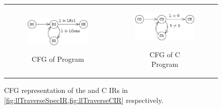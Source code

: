 \begin{figure}
\begin{tabular}{@{}c@{}c@{}}
\begin{subfigure}[b]{0.5\textwidth}
\begin{center}
{\includegraphics[scale=1.4]{chapters/figures/figSumListSpecCfg.pdf}}
\end{center}
\caption{\label{fig:llTraverseSpecCFG}CFG of \SpecL{} Program}
\end{subfigure}%
&
\begin{subfigure}[b]{0.5\textwidth}
\begin{center}
{\includegraphics[scale=1.4]{chapters/figures/figSumListCCfg.pdf}}
\end{center}
\caption{\label{fig:llTraverseCCFG}CFG of C Program}
\end{subfigure}%
\\
\end{tabular}
\caption{\label{fig:llTraverseSpecAndCCFG}CFG representation of the \SpecL{} and C IRs in \cref{fig:llTraverseSpecIR,fig:llTraverseCIR} respectively.}
\end{figure}
